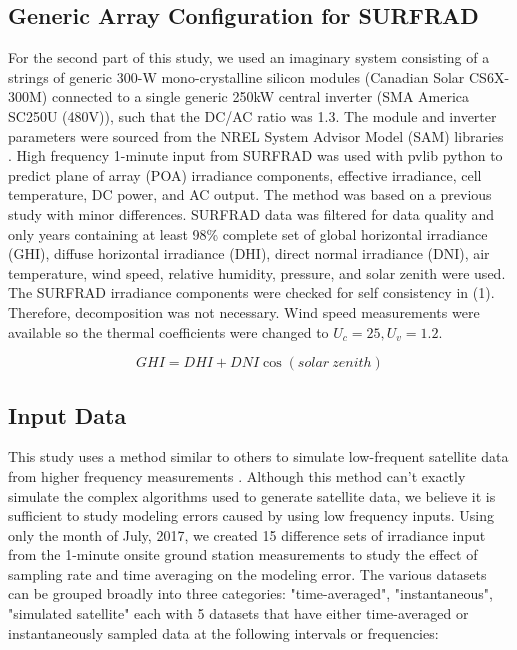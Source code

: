 \documentclass[conference]{IEEEtran}
\begin{document}
\subsection{Generic Array Configuration for SURFRAD}
For the second part of this study, we used an imaginary system consisting of a strings of generic 300-W mono-crystalline silicon modules (Canadian Solar CS6X-300M) connected to a single generic 250kW central inverter (SMA America SC250U (480V)), such that the DC/AC ratio was 1.3. The module and inverter parameters were sourced from the NREL System Advisor Model (SAM) libraries \cite{Freeman2018}. High frequency 1-minute input from SURFRAD \cite{Augustine2000} was used with pvlib python \cite{pvlib2018} to predict plane of array (POA) irradiance components, effective irradiance, cell temperature, DC power, and AC output. The method was based on a previous study \cite{9519024} with minor differences. SURFRAD data was filtered for data quality and only years containing at least 98\% complete set of global horizontal irradiance (GHI), diffuse horizontal irradiance (DHI), direct normal irradiance (DNI), air temperature, wind speed, relative humidity, pressure, and solar zenith were used. The SURFRAD irradiance components were checked for self consistency in (1). Therefore, decomposition was not necessary. Wind speed measurements were available so the thermal coefficients were changed to $U_c=25, U_v=1.2$.

$$\mathit{GHI} = \mathit{DHI} + \mathit{DNI} \cos{\left(\mathit{solar\ zenith}\right)}$$

\subsection{Input Data}
This study uses a method similar to others to simulate low-frequent satellite data from higher frequency measurements \cite{Bowersox2021}. Although this method can't exactly simulate the complex algorithms used to generate satellite data, we believe it is sufficient to study modeling errors caused by using low frequency inputs. Using only the month of July, 2017, we created 15 difference sets of irradiance input from the 1-minute onsite ground station measurements to study the effect of sampling rate and time averaging on the modeling error. The various datasets can be grouped broadly into three categories: "time-averaged", "instantaneous", "simulated satellite" each with 5 datasets that have either time-averaged or instantaneously sampled data at the following intervals or frequencies:
\end{document}
